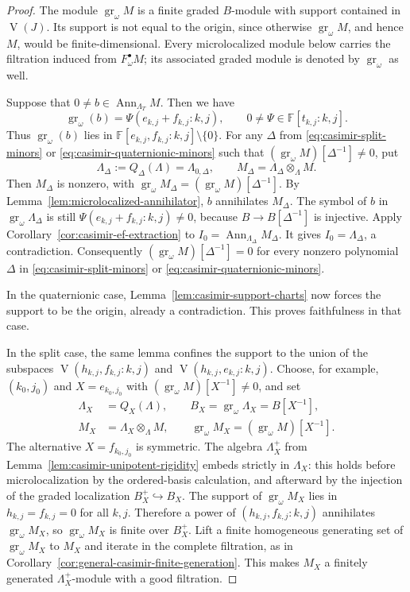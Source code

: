 \documentclass[11pt]{article}
\numberwithin{equation}{section}
\theoremstyle{definition}
\theoremstyle{remark}
\newcommand{\F}{\mathbb F}
\DeclareMathOperator{\gr}{gr}
\DeclareMathOperator{\Ann}{Ann}
\begin{document}
\begin{proof}
The module $\gr_\omega M$ is a finite graded $B$-module with
support contained in $\operatorname{V}(J)$. Its support is not
equal to the origin, since otherwise $\gr_\omega M$, and hence $M$,
would be finite-dimensional. Every microlocalized module below carries
the filtration induced from $F_\omega^\bullet M$; its associated
graded module is denoted by $\gr_\omega$ as well.

Suppose that $0\ne b\in\Ann_{\Lambda_T}M$. Then we have 
\[
 \gr_\omega(b)=\Psi(e_{k,j}+f_{k,j}:k,j),
 \qquad 0\ne\Psi\in\F[t_{k,j}:k,j].
\]
Thus $\gr_\omega(b)$ lies in $\F[e_{k,j},f_{k,j}:k,j]\setminus\{0\}$.
For any $\Delta$ from \eqref{eq:casimir-split-minors} or
\eqref{eq:casimir-quaternionic-minors} such that
$(\gr_\omega M)[\Delta^{-1}]\ne0$, put
\[
 \Lambda_\Delta:=Q_\Delta(\Lambda)=\Lambda_{0,\Delta},\qquad
 M_\Delta=\Lambda_\Delta\otimes_{\Lambda}M.
\]
Then $M_\Delta$ is nonzero, with
$\gr_\omega M_\Delta=(\gr_\omega M)[\Delta^{-1}]$.
By Lemma~\ref{lem:microlocalized-annihilator}, $b$ annihilates
$M_\Delta$. The symbol of $b$ in $\gr_\omega\Lambda_\Delta$ is still
$\Psi(e_{k,j}+f_{k,j}:k,j)\ne0$, because $B\to B[\Delta^{-1}]$ is injective.
Apply Corollary~\ref{cor:casimir-ef-extraction} to
$I_0=\Ann_{\Lambda_\Delta}M_\Delta$. It gives
$I_0=\Lambda_\Delta$, a contradiction.
Consequently $(\gr_\omega M)[\Delta^{-1}]=0$ for every nonzero polynomial
$\Delta$ in \eqref{eq:casimir-split-minors} or
\eqref{eq:casimir-quaternionic-minors}.

In the quaternionic case, Lemma~\ref{lem:casimir-support-charts}
now forces the support to be the origin, already a contradiction.
This proves faithfulness in that case.

In the split case, the same lemma confines the support to the union of the
subspaces $\operatorname{V}(h_{k,j},f_{k,j}:k,j)$ and
$\operatorname{V}(h_{k,j},e_{k,j}:k,j)$.
Choose, for example, $(k_0,j_0)$ and $X=e_{k_0,j_0}$ with
$(\gr_\omega M)[X^{-1}]\ne0$, and set
\[
 \begin{aligned}
 \Lambda_X&=Q_X(\Lambda),\qquad
 B_X=\gr_\omega\Lambda_X=B[X^{-1}],\\
 M_X&=\Lambda_X\otimes_{\Lambda}M,\qquad
 \gr_\omega M_X=(\gr_\omega M)[X^{-1}].
 \end{aligned}
\]
The alternative $X=f_{k_0,j_0}$ is symmetric.
The algebra $\Lambda_X^{+}$ from Lemma~\ref{lem:casimir-unipotent-rigidity}
embeds strictly in $\Lambda_X$: this holds before microlocalization by
the ordered-basis calculation, and afterward by the injection
of the graded localization $B_X^{+}\hookrightarrow B_X$.
The support of $\gr_\omega M_X$ lies in $h_{k,j}=f_{k,j}=0$ for all
$k,j$. Therefore a power of
$(h_{k,j},f_{k,j}:k,j)$ annihilates $\gr_\omega M_X$, so
$\gr_\omega M_X$ is finite over $B_X^{+}$.
Lift a finite homogeneous generating set of $\gr_\omega M_X$ to $M_X$
and iterate in the complete filtration, as in
Corollary~\ref{cor:general-casimir-finite-generation}.
This makes $M_X$ a finitely generated $\Lambda_X^{+}$-module with a
good filtration.


\end{proof}
\end{document}
